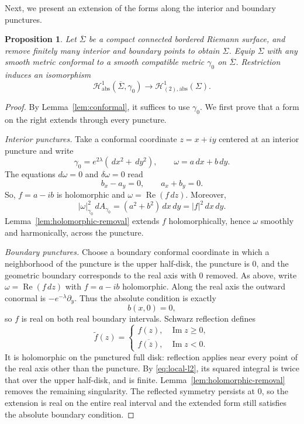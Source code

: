 \documentclass[11pt]{amsart}
\numberwithin{equation}{section}
\newtheorem{proposition}[theorem]{Proposition}
\theoremstyle{definition}
\theoremstyle{remark}
\newcommand{\HH}{\mathcal H}
\newcommand{\Sigmabar}{\overline\Sigma}
\newcommand{\dd}{\,d}
\DeclareMathOperator{\Rea}{Re}
\begin{document}
Next, we present an extension of the forms along the interior and boundary punctures.
\begin{proposition}\label{prop:hodge-extension}
Let $\Sigmabar$ be a compact connected bordered Riemann surface, and remove finitely many interior and boundary points to obtain $\Sigma$. Equip $\Sigma$ with any smooth metric conformal to a smooth compatible metric $\gamma_0$ on $\Sigmabar$. Restriction induces an isomorphism
\begin{equation}\label{eq:hodge-isomorphism}
\HH^1_{\mathrm{abs}}(\Sigmabar,\gamma_0)
\longrightarrow\HH^1_{(2),\mathrm{abs}}(\Sigma).
\end{equation}
\end{proposition}
\begin{proof}
By Lemma~\ref{lem:conformal}, it suffices to use $\gamma_0$. We first prove that a form on the right extends through every puncture.

\emph{Interior punctures.}
Take a conformal coordinate $z=x+iy$ centered at an interior puncture and write
\[
\gamma_0=e^{2\lambda}(\dd x^2+\dd y^2),\qquad
\omega=a\dd x+b\dd y.
\]
The equations $d\omega=0$ and $\delta\omega=0$ read
\[
b_x-a_y=0,\qquad a_x+b_y=0.
\]
So, $f=a-ib$ is holomorphic and
$\omega=\Rea(f\dd z)$. Moreover,
\begin{equation}\label{eq:local-l2}
|\omega|_{\gamma_0}^2\dd A_{\gamma_0}
=(a^2+b^2)\dd x\dd y=|f|^2\dd x\dd y.
\end{equation}
Lemma~\ref{lem:holomorphic-removal} extends $f$ holomorphically, hence $\omega$ smoothly and harmonically, across the puncture.

\emph{Boundary punctures.}
Choose a boundary conformal coordinate in which a neighborhood of the puncture is the upper half-disk, the puncture is $0$, and the geometric boundary corresponds to the real axis with $0$ removed. As above, write $\omega=\Rea(f\dd z)$ with $f=a-ib$ holomorphic. Along the real axis the outward conormal is $-e^{-\lambda}\partial_y$. Thus the absolute condition is exactly
\[
b(x,0)=0,
\]
so $f$ is real on both real boundary intervals. Schwarz reflection defines
\[
\widetilde f(z)=
\begin{cases}
f(z),&\operatorname{Im}z\ge0,\\
\overline{f(\overline z)},&\operatorname{Im}z<0.
\end{cases}
\]
It is holomorphic on the punctured full disk: reflection applies near every point of the real axis other than the puncture. By \eqref{eq:local-l2}, its squared integral is twice that over the upper half-disk, and is finite. Lemma~\ref{lem:holomorphic-removal} removes the remaining singularity. The reflected symmetry persists at $0$, so the extension is real on the entire real interval and the extended form still satisfies the absolute boundary condition.


\end{proof}
\end{document}
